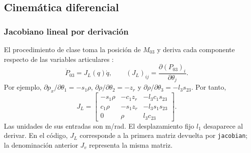\subsection{Cinemática diferencial}
\subsubsection{Jacobiano lineal por derivación}
El procedimiento de clase toma la posición de $M_{03}$ y deriva cada componente respecto de las variables articulares \parencite{course6,course7}:
\begin{equation}
\dot P_{03}=J_L(q)\dot q,\qquad
(J_L)_{ij}=\frac{\partial (P_{03})_i}{\partial\theta_j}.
\end{equation}
Por ejemplo, $\partial p_x/\partial\theta_1=-s_1\rho$, $\partial\rho/\partial\theta_2=-z_r$ y $\partial\rho/\partial\theta_3=-l_3s_{23}$. Por tanto,
\begin{equation}
J_L=\begin{bmatrix}
-s_1\rho&-c_1z_r&-l_3c_1s_{23}\\
c_1\rho&-s_1z_r&-l_3s_1s_{23}\\
0&\rho&l_3c_{23}
\end{bmatrix}.
\end{equation}
Las unidades de sus entradas son m/rad. El desplazamiento fijo $l_1$ desaparece al derivar. En el código, $J_L$ corresponde a la primera matriz devuelta por \texttt{jacobian}; la denominación anterior $J_v$ representa la misma matriz.

